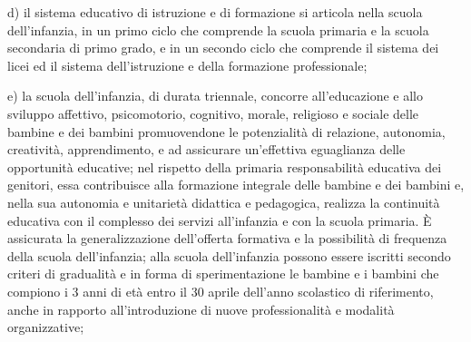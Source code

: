 d) il sistema educativo di istruzione e di formazione si articola nella scuola dell'infanzia, in un primo ciclo che comprende la scuola primaria e la scuola secondaria di primo grado, e in un secondo ciclo che comprende il sistema dei licei ed il sistema dell'istruzione e della formazione professionale;

e) la scuola dell'infanzia, di durata triennale, concorre all'educazione e allo sviluppo affettivo, psicomotorio, cognitivo, morale, religioso e sociale delle bambine e dei bambini promuovendone le potenzialità di relazione, autonomia, creatività, apprendimento, e ad assicurare un'effettiva eguaglianza delle opportunità educative; nel rispetto della primaria responsabilità educativa dei genitori, essa contribuisce alla formazione integrale delle bambine e dei bambini e, nella sua autonomia e unitarietà didattica e pedagogica, realizza la continuità educativa con il complesso dei servizi all'infanzia e con la scuola primaria. È assicurata la generalizzazione dell'offerta formativa e la possibilità di frequenza della scuola dell'infanzia; alla scuola dell'infanzia possono essere iscritti secondo criteri di gradualità e in forma di sperimentazione le bambine e i bambini che compiono i 3 anni di età entro il 30 aprile dell'anno scolastico di riferimento, anche in rapporto all'introduzione di nuove professionalità e modalità organizzative;

